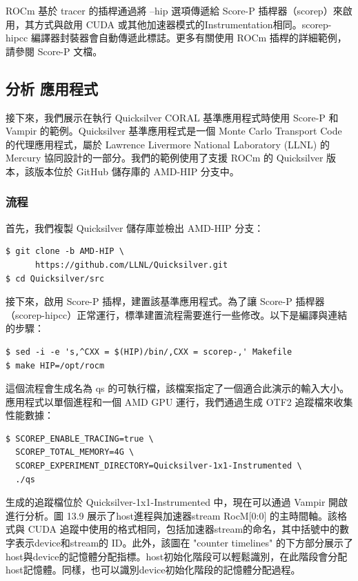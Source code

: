 ROCm 基於 tracer 的插桿通過將 --hip 選項傳遞給 Score-P 插桿器（scorep）來啟用，其方式與啟用 CUDA 或其他加速器模式的Instrumentation相同。scorep-hipcc 編譯器封裝器會自動傳遞此標誌。更多有關使用 ROCm 插桿的詳細範例，請參閱 Score-P 文檔。

\subsection{分析 \Quicksilver 應用程式}
接下來，我們展示在執行 Quicksilver CORAL 基準應用程式時使用 Score-P 和 Vampir 的範例。Quicksilver 基準應用程式是一個 Monte Carlo Transport Code 的代理應用程式，屬於 Lawrence Livermore National Laboratory (LLNL) 的 Mercury 協同設計的一部分。我們的範例使用了支援 ROCm 的 Quicksilver 版本，該版本位於 GitHub 儲存庫的 AMD-HIP 分支中。

\subsubsection{流程}
首先，我們複製 Quicksilver 儲存庫並檢出 AMD-HIP 分支：
\begin{lstlisting}
$ git clone -b AMD-HIP \
      https:∕∕github.com∕LLNL∕Quicksilver.git
$ cd Quicksilver∕src
\end{lstlisting}

接下來，啟用 Score-P 插桿，建置該基準應用程式。為了讓 Score-P 插桿器（scorep-hipcc）正常運行，標準建置流程需要進行一些修改。以下是編譯與連結的步驟：

\begin{lstlisting}
$ sed -i -e 's,^CXX = $(HIP)∕bin∕,CXX = scorep-,' Makefile
$ make HIP=∕opt∕rocm
\end{lstlisting}



這個流程會生成名為 qs 的可執行檔，該檔案指定了一個適合此演示的輸入大小。應用程式以單個進程和一個 AMD GPU 運行，我們通過生成 OTF2 追蹤檔來收集性能數據：
\begin{lstlisting}
$ SCOREP_ENABLE_TRACING=true \
  SCOREP_TOTAL_MEMORY=4G \
  SCOREP_EXPERIMENT_DIRECTORY=Quicksilver-1x1-Instrumented \
  .∕qs
\end{lstlisting}

生成的追蹤檔位於 Quicksilver-1x1-Instrumented 中，現在可以通過 Vampir 開啟進行分析。圖 13.9 展示了host進程與加速器stream RocM[0:0] 的主時間軸。該格式與 CUDA 追蹤中使用的格式相同，包括加速器stream的命名，其中括號中的數字表示device和stream的 ID。此外，該圖在 "counter timelines" 的下方部分展示了host與device的記憶體分配指標。host初始化階段可以輕鬆識別，在此階段會分配host記憶體。同樣，也可以識別device初始化階段的記憶體分配過程。

